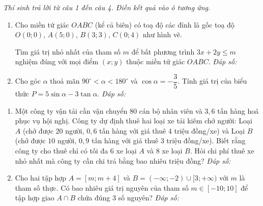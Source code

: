 \documentclass[12pt,a4paper]{article}
\newcommand{\parttitle}[1]{\par\vspace{1.5pt}\needspace{2\baselineskip}{\large\bfseries\color{ink}#1}\par\nopagebreak\vspace{1pt}}
\newcommand{\answerbox}{\hfill\textit{Đáp số:}\ \fbox{\rule{0pt}{9pt}\hspace{2.2cm}}}
\begin{document}
\parttitle{PHẦN III. Trắc nghiệm trả lời ngắn}
\textit{Thí sinh trả lời từ câu 1 đến câu 4. Điền kết quả vào ô tương ứng.}
\begin{enumerate}
\item Cho miền tứ giác $OABC$ (kể cả biên) có toạ độ các đỉnh là gốc toạ độ $O(0; 0)$, $A(5; 0)$, $B(3; 3)$, $C(0; 4)$ như hình vẽ.

\begin{center}
\vspace{-4pt}
\vspace{-6pt}
\end{center}

Tìm giá trị nhỏ nhất của tham số $m$ để bất phương trình $3x + 2y \le m$ nghiệm đúng với mọi điểm $(x; y)$ thuộc miền tứ giác $OABC$.
\answerbox

\item Cho góc $\alpha$ thoả mãn $90^\circ < \alpha < 180^\circ$ và $\cos \alpha = -\dfrac{3}{5}$. Tính giá trị của biểu thức $P = 5\sin \alpha - 3\tan \alpha$.
\answerbox
\end{enumerate}
\newpage

\begin{enumerate}[resume]
\item Một công ty vận tải cần vận chuyển $80$ cán bộ nhân viên và $3{,}6$ tấn hàng hoá phục vụ hội nghị. Công ty dự định thuê hai loại xe tải kiêm chở người: Loại $A$ (chở được $20$ người, $0{,}6$ tấn hàng với giá thuê $4$ triệu đồng/xe) và Loại $B$ (chở được $10$ người, $0{,}9$ tấn hàng với giá thuê $3$ triệu đồng/xe). Biết rằng công ty cho thuê chỉ có tối đa $6$ xe loại $A$ và $8$ xe loại $B$. Hỏi chi phí thuê xe nhỏ nhất mà công ty cần chi trả bằng bao nhiêu triệu đồng?
\answerbox

\item Cho hai tập hợp $A = [m; m + 4]$ và $B = (-\infty; -2) \cup [3; +\infty)$ với $m$ là tham số thực. Có bao nhiêu giá trị nguyên của tham số $m \in [-10; 10]$ để tập hợp giao $A \cap B$ chứa đúng $3$ số nguyên?
\answerbox
\end{enumerate}
\end{document}
